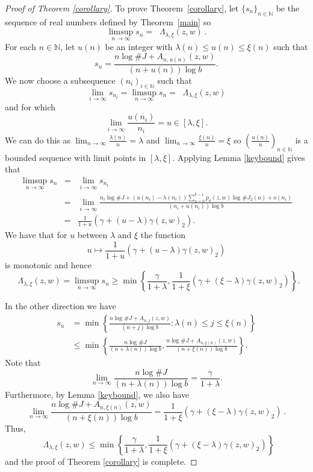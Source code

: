 \documentclass[12pt]{article}
\theoremstyle{remark}
\numberwithin{equation}{section}
\renewcommand{\Bbb}[1]{\mathbb{#1}}
\newcommand{\N}{{\Bbb N}}         %
\newcommand{\0}{\mathbf{0}}
\DeclareMathOperator{\dimh}{\dim_H}
\begin{document}
\begin{proof}[Proof of Theorem \ref{corollary}]
To prove Theorem~\ref{corollary}, let $\{s_{n}\}_{n \in \N}$ be the sequence of real numbers defined by Theorem~\ref{main} so
\begin{equation*}
\limsup_{n \to \infty} s_{n}=\dimh \Lambda_{\lambda,\xi}(z,w)\, .
\end{equation*}
For each $n \in \N$, let $u(n)$ be an integer with $\lambda(n)\leq u(n) \leq \xi(n)$ such that 
\begin{equation*}
s_n=\frac{n\log\#J+A_{n,u(n)}(z,w)}{(n+u(n))\log b}.
\end{equation*}
We now choose a subsequence $(n_i)_{i\in \N}$ such that
\[\lim_{i\to\infty}s_{n_i}=\limsup_{n\to\infty}s_n=\dimh \Lambda_{\lambda,\xi}(z,w)\] 
and for which
\[\lim_{i \to \infty} \frac{ u(n_{i}) }{ n_{i} }=u\in [\lambda,\xi].\] 
We can do this as $\lim_{n\to\infty}\tfrac{\lambda(n)}{n}=\lambda$ and $\lim_{n\to\infty}\tfrac{\xi(n)}{n}=\xi$ so $\left(\frac{u(n)}{n}\right)_{n\in\N}$ is a bounded sequence with limit points in $[\lambda,\xi]$. 
Applying Lemma \ref{keybound} gives that  
\begin{eqnarray*}
\limsup_{n\to\infty}s_n&=&\lim_{i\to\infty}s_{n_i}\\
&=&\lim_{i\to\infty}\frac{n_i\log\#J+( u(n_i)-\lambda(n_{i}))\sum_{a=0}^{b-1} p_a(z,w)\log\#J_2(a)+\mathit{o}(n_i)}{(n_i+u(n_i))\log b}\\
&=&\frac{1}{1+u}(\gamma+(u-\lambda)\gamma(z,w)_2).
\end{eqnarray*}
We have that for $u$ between $\lambda$ and $\xi$ the function 
\[u\mapsto\frac{1}{1+u}(\gamma+(u-\lambda)\gamma(z,w)_2)\] is monotonic and hence
$$\dimh\Lambda_{\lambda,\xi}(z,w)=\limsup_{n\to\infty}s_n\geq \min\left\{\frac{\gamma}{1+\lambda},\frac{1}{1+\xi}(\gamma+(\xi-\lambda)\gamma(z,w)_2)\right\}.$$

In the other direction we have
\begin{align*}
s_n&=\min\left\{\frac{n\log\#J+A_{n,j}(z,w)}{(n+j)\log b}:\lambda(n)\leq j\leq\xi(n)\right\} \\
   &\leq\min\left\{\frac{n\log\#J}{(n+\lambda(n))\log b},\frac{n\log\#J+A_{n,\xi(n)}(z,w)}{(n+\xi(n))\log b}\right\}.
\end{align*} 
Note that
$$\lim_{n\to\infty}\frac{n\log\#J}{(n+\lambda(n))\log b}=\frac{\gamma}{1+\lambda}.$$ 
Furthermore, by Lemma \ref{keybound}, we also have
$$\lim_{n\to\infty}\frac{n\log\#J+A_{n,\xi(n)}(z,w)}{(n+\xi(n))\log b}=\frac{1}{1+\xi}\left(\gamma+(\xi-\lambda)\gamma(z,w)_2\right)\, .$$
Thus,
$$\dimh\Lambda_{\lambda,\xi}(z,w)\leq \min\left\{\frac{\gamma}{1+\lambda},\frac{1}{1+\xi}\left(\gamma+(\xi-\lambda)\gamma(z,w)_2\right)\right\}$$
and the proof of Theorem \ref{corollary} is complete. 
\end{proof}
\end{document}
